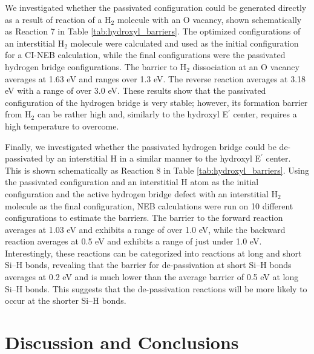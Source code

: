 \documentclass[aps,prb,reprint,superscriptaddress,showpacs]{revtex4-1}
\begin{document}
We investigated whether the passivated configuration could be generated directly as a result of reaction of a H$_2$ molecule with an O vacancy, shown schematically as Reaction 7 in Table \ref{tab:hydroxyl_barriers}. The optimized configurations of an interstitial H$_2$ molecule were calculated and used as the initial configuration for a CI-NEB calculation, while the final configurations were the passivated hydrogen bridge configurations. The barrier to H$_2$ dissociation at an O vacancy averages at 1.63 eV and ranges over 1.3 eV. The reverse reaction averages at 3.18 eV with a range of over 3.0 eV. These results show that the passivated configuration of the hydrogen bridge is very stable; however, its formation barrier from H$_2$ can be rather high and, similarly to the hydroxyl E$^\prime$ center, requires a high temperature to overcome.

Finally, we investigated whether the passivated hydrogen bridge could be de-passivated by an interstitial H in a similar manner to the hydroxyl E$^\prime$ center. This is shown schematically as Reaction 8 in Table \ref{tab:hydroxyl_barriers}. Using the passivated configuration and an interstitial H atom as the initial configuration and the active hydrogen bridge defect with an interstitial H$_2$ molecule as the final configuration, NEB calculations were run on 10 different configurations to estimate the barriers. The barrier to the forward reaction  averages at 1.03 eV and exhibits a range of over 1.0 eV, while the backward reaction averages at 0.5 eV and exhibits a range of just under 1.0 eV. Interestingly, these reactions can be categorized into reactions at long and short \mbox{Si--H} bonds, revealing that the barrier for de-passivation at short \mbox{Si--H} bonds averages at 0.2 eV and is much lower than the average barrier of 0.5 eV at long \mbox{Si--H} bonds. This suggests that the de-passivation reactions will be more likely to occur at the shorter \mbox{Si--H} bonds.

\section{Discussion and Conclusions}
\end{document}
